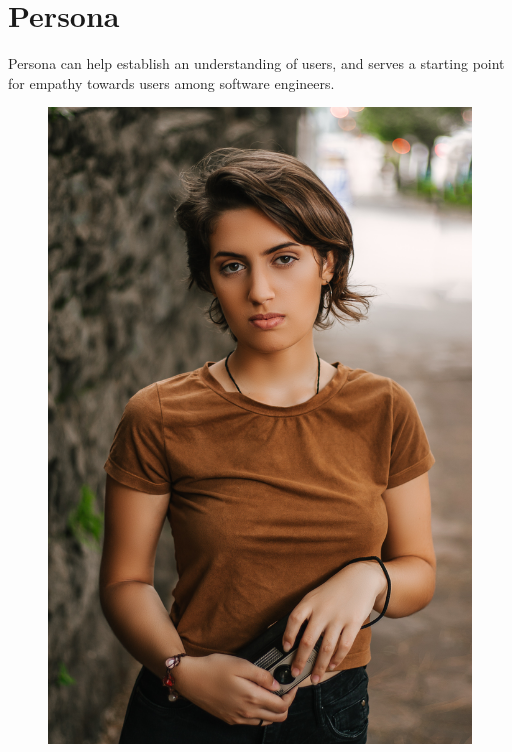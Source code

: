 \documentclass[11pt, english]{report}
\begin{document}
\chapter{Persona}
Persona can help establish an understanding of users, and serves a starting point for empathy towards users among software engineers\cite{usermodeling}.  
 \\ 
\begin{figure}
\includegraphics[width=0.9\linewidth]{images/girl_School.jpg} 
\label{fig:wrapfig}
\end{figure}
\end{document}
